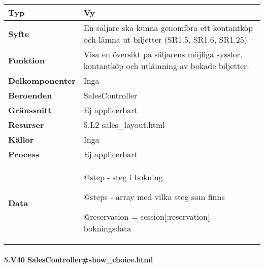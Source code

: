 \documentclass[a4paper, twoside, 11pt, titlepage]{article}
\begin{document}
			\begin {table} [ht] \begin{tabular} {  p{3.5cm} p{11.6cm} }
				\hline
				{\sffamily\textbf{Typ}} & {Vy} \\
				\hline
				{\sffamily\textbf{Syfte}} & {En säljare ska kunna genomföra ett kontantköp och lämna ut biljetter (SR1.5, SR1.6, SR1.25)} \\
				\hline
				{\sffamily\textbf{Funktion}} & {Visa en översikt på säljarens möjliga sysslor, kontantköp och utlämning av bokade biljetter.} \\
				\hline
				{\sffamily\textbf{Delkomponenter}} & {Inga} \\
				\hline
				{\sffamily\textbf{Beroenden}} & {SalesController} \\
				\hline
				{\sffamily\textbf{Gränssnitt}} & {Ej applicerbart} \\
				\hline
				{\sffamily\textbf{Resurser}} & {5.L2 sales\_layout.html} \\
				\hline
				{\sffamily\textbf{Källor}} & {Inga} \\
				\hline
				{\sffamily\textbf{Process}} & {Ej applicerbart} \\
				\hline
				{\sffamily\textbf{Data}} & {@step - steg i bokning

@steps - array med vilka steg som finns

@reservation = session[:reservation] - bokningsdata} \\
				\hline
			\end{tabular} \end{table} \FloatBarrier


			\clearpage %
			\paragraph{5.V40 SalesController\#show\_choice.html}\
\end{document}
